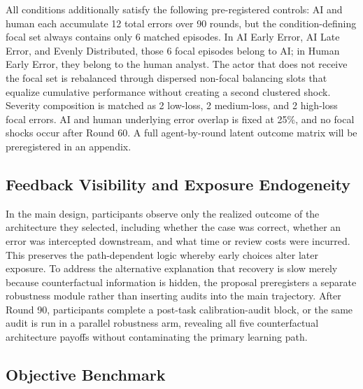 \documentclass[man,natbib]{apa7}
\begin{document}
All conditions additionally satisfy the following pre-registered controls: AI and human each accumulate 12 total errors over 90 rounds, but the condition-defining focal set always contains only 6 matched episodes. In AI Early Error, AI Late Error, and Evenly Distributed, those 6 focal episodes belong to AI; in Human Early Error, they belong to the human analyst. The actor that does not receive the focal set is rebalanced through dispersed non-focal balancing slots that equalize cumulative performance without creating a second clustered shock. Severity composition is matched as 2 low-loss, 2 medium-loss, and 2 high-loss focal errors. AI and human underlying error overlap is fixed at 25\%, and no focal shocks occur after Round 60. A full agent-by-round latent outcome matrix will be preregistered in an appendix.

\subsection{Feedback Visibility and Exposure Endogeneity}

In the main design, participants observe only the realized outcome of the architecture they selected, including whether the case was correct, whether an error was intercepted downstream, and what time or review costs were incurred. This preserves the path-dependent logic whereby early choices alter later exposure. To address the alternative explanation that recovery is slow merely because counterfactual information is hidden, the proposal preregisters a separate robustness module rather than inserting audits into the main trajectory. After Round 90, participants complete a post-task calibration-audit block, or the same audit is run in a parallel robustness arm, revealing all five counterfactual architecture payoffs without contaminating the primary learning path.

\subsection{Objective Benchmark}
\end{document}
